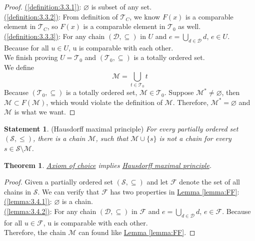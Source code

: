 \documentclass[12pt]{amsart}
\numberwithin{equation}{section}
\theoremstyle{plain} %
\newtheorem{theorem}[equation]{Theorem}
\theoremstyle{definition}
\newtheorem{statement}[equation]{Statement}
\theoremstyle{remark}
\begin{document}
\begin{proof}
\hyperref[definition:3.3.1]{(\ref*{definition:3.3.1})}: $\varnothing$ is subset of any set. \\  
\hyperref[definition:3.3.2]{(\ref*{definition:3.3.2})}: From definition of $\mathcal{T}_C$, we know $F(x)$ is a comparable element in $\mathcal{T}_C$, so $F(x)$ is a comparable element in $\mathcal{T}_0$ as well. \\
\hyperref[definition:3.3.3]{(\ref*{definition:3.3.3})}: For any chain $(\mathcal{D}, \subseteq)$ in $U$ and $e = \bigcup_{d \in \mathcal{D}}d$, $e \in U$. Because for all $u \in U$, u is comparable with each other. \\
We finish proving $U = \mathcal{T}_0$ and $(\mathcal{T}_0, \subseteq)$ is a totally ordered set.  \\
We define  
$$\mathcal{M} = \bigcup_{t \in \mathcal{T}_0}t $$
Because $(\mathcal{T}_0, \subseteq)$ is a totally ordered set, $\mathcal{M} \in \mathcal{T}_0$. Suppose $\mathcal{M}^*\neq \varnothing$, then $\mathcal{M} \subset F(\mathcal{M})$, which would violate the definition of $\mathcal{M}$. Therefore, $\mathcal{M}^*= \varnothing$ and $\mathcal{M}$ is what we want. 
\end{proof}

\begin{statement}
\label{statement:Hausdorff maximal principle}
(Hausdorff maximal principle) \textit{For every partially ordered set $(\mathcal{S}, \leq)$, there is a chain $\mathcal{M}$, such that $\mathcal{M} \cup \{s\}$ is not a chain for every $s \in \mathcal{S} \setminus \mathcal{M}$. } 
\end{statement}

\begin{theorem}
\hyperref[statement:Axiom of choice]{Axiom of choice} implies \hyperref[statement:Hausdorff maximal principle]{Hausdorff maximal principle}.
\end{theorem}

\begin{proof}
Given a partially ordered set $(\mathcal{S}, \subseteq)$ and let $\mathcal{F}$ denote the set of all chains in $\mathcal{S}$. We can verify that $\mathcal{F}$ has two properties in \hyperref[lemma:FF]{Lemma \ref*{lemma:FF}}: \\
\hyperref[lemma:3.4.1]{(\ref*{lemma:3.4.1})}: $\varnothing$ is a chain. \\  
\hyperref[lemma:3.4.2]{(\ref*{lemma:3.4.2})}: For any chain $(\mathcal{D}, \subseteq)$ in $\mathcal{F}$ and $e = \bigcup_{d \in \mathcal{D}}d$, $e \in \mathcal{F}$. Because for all $u \in \mathcal{F}$, u is comparable with each other. \\
Therefore, the chain $\mathcal{M}$ can found like \hyperref[lemma:FF]{Lemma \ref*{lemma:FF}}. 
\end{proof}
\end{document}
